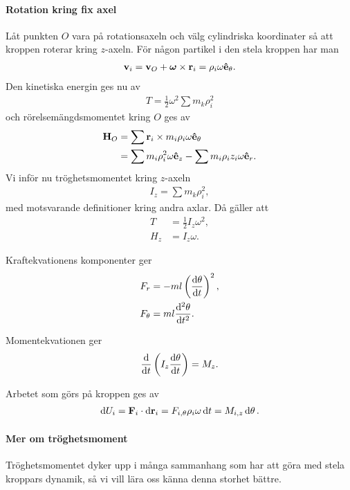 \paragraph{Rotation kring fix axel}
Låt punkten $O$ vara på rotationsaxeln och välg cylindriska koordinater så att kroppen roterar kring $z$-axeln. För någon partikel i den stela kroppen har man
\begin{align*}
	\vb{v}_{i} = \vb{v}_{O} + \vb*{\omega}\times\vb{r}_{i} = \rho_{i}\omega\vu{e}_{\theta}.
\end{align*}
Den kinetiska energin ges nu av
\begin{align*}
	T = \frac{1}{2}\omega^2\sum m_{k}\rho_{i}^2
\end{align*}
och rörelsemängdsmomentet kring $O$ ges av
\begin{align*}
	\vb{H}_{O} &= \sum \vb{r}_{i}\times m_{i}\rho_{i}\omega\vu{e}_{\theta} \\
	           &= \sum m_{i}\rho_{i}^2\omega\vu{e}_{z} - \sum m_{i}\rho_{i}z_{i}\omega\vu{e}_{r}.
\end{align*}
Vi inför nu tröghetsmomentet kring $z$-axeln
\begin{align*}
	I_{z} = \sum m_{k}\rho_{i}^2,
\end{align*}
med motsvarande definitioner kring andra axlar. Då gäller att
\begin{align*}
	T     &= \frac{1}{2}I_{z}\omega^2, \\
	H_{z} &= I_{z}\omega.
\end{align*}

Kraftekvationens komponenter ger
\begin{align*}
	F_{r}      &= -ml\left(\dv{\theta}{t}\right)^2, \\
	F_{\theta} &= ml\dv[2]{\theta}{t}.
\end{align*}

Momentekvationen ger
\begin{align*}
	\dv{t}\left(I_{z}\dv{\theta}{t}\right) = M_{z}.
\end{align*}

Arbetet som görs på kroppen ges av
\begin{align*}
	\dd{U_{i}} = \vb{F}_{i}\cdot\dd{\vb{r}_{i}} = F_{i, \theta}\rho_{i}\omega\dd{t} = M_{i, z}\dd{\theta}.
\end{align*}

\paragraph{Mer om tröghetsmoment}
Tröghetsmomentet dyker upp i många sammanhang som har att göra med stela kroppars dynamik, så vi vill lära oss känna denna storhet bättre.


